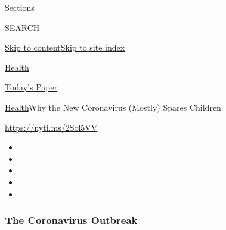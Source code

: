 Sections

SEARCH

\protect\hyperlink{site-content}{Skip to
content}\protect\hyperlink{site-index}{Skip to site index}

\href{https://www.nytimes3xbfgragh.onion/section/health}{Health}

\href{https://myaccount.nytimes3xbfgragh.onion/auth/login?response_type=cookie\&client_id=vi}{}

\href{https://www.nytimes3xbfgragh.onion/section/todayspaper}{Today's
Paper}

\href{/section/health}{Health}\textbar{}Why the New Coronavirus (Mostly)
Spares Children

\url{https://nyti.ms/2Sol5VV}

\begin{itemize}
\item
\item
\item
\item
\item
\end{itemize}

\hypertarget{the-coronavirus-outbreak}{%
\subsubsection{\texorpdfstring{\href{https://www.nytimes3xbfgragh.onion/news-event/coronavirus?name=styln-coronavirus-national\&region=TOP_BANNER\&block=storyline_menu_recirc\&action=click\&pgtype=Article\&impression_id=d9441360-f1ea-11ea-b089-5de7c98ed547\&variant=undefined}{The
Coronavirus
Outbreak}}{The Coronavirus Outbreak}}\label{the-coronavirus-outbreak}}

